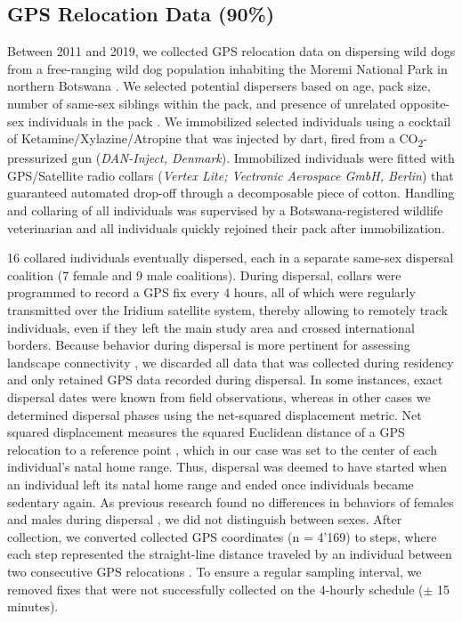 \documentclass[abstract=on,10pt,a4paper,bibliography=totocnumbered]{article}
\begin{document}
\subsection{GPS Relocation Data (90\%)}
Between 2011 and 2019, we collected GPS relocation data on dispersing wild dogs
from a free-ranging wild dog population inhabiting the Moremi National Park in
northern Botswana \citep{Cozzi.2020, Hofmann.2021}. We selected potential
dispersers based on age, pack size, number of same‐sex siblings within the pack,
and presence of unrelated opposite-sex individuals in the pack
\citep{McNutt.1996, Behr.2020}. We immobilized selected individuals using a
cocktail of Ketamine/Xylazine/Atropine \citep{Osofsky.1996, Cozzi.2020} that was
injected by dart, fired from a CO\textsubscript{2}-pressurized gun
(\textit{DAN-Inject, Denmark}). Immobilized individuals were fitted with
GPS/Satellite radio collars (\textit{Vertex Lite; Vectronic Aerospace GmbH,
Berlin}) that guaranteed automated drop-off through a decomposable piece of
cotton. Handling and collaring of all individuals was supervised by a
Botswana-registered wildlife veterinarian and all individuals quickly rejoined
their pack after immobilization.

16 collared individuals eventually dispersed, each in a separate same-sex
dispersal coalition (7 female and 9 male coalitions). During dispersal, collars
were programmed to record a GPS fix every 4 hours, all of which were regularly
transmitted over the Iridium satellite system, thereby allowing to remotely
track individuals, even if they left the main study area and crossed
international borders. Because behavior during dispersal is more pertinent for
assessing landscape connectivity \citep{Elliot.2014, Abrahms.2017}, we discarded
all data that was collected during residency and only retained GPS data recorded
during dispersal. In some instances, exact dispersal dates were known from field
observations, whereas in other cases we determined dispersal phases using the
net-squared displacement metric. Net squared displacement measures the squared
Euclidean distance of a GPS relocation to a reference point \citep{Borger.2012},
which in our case was set to the center of each individual's natal home range.
Thus, dispersal was deemed to have started when an individual left its natal
home range and ended once individuals became sedentary again. As previous
research found no differences in behaviors of females and males during dispersal
\citep{Woodroffe.2019, Cozzi.2020}, we did not distinguish between sexes. After
collection, we converted collected GPS coordinates (n = 4'169) to steps, where
each step represented the straight-line distance traveled by an individual
between two consecutive GPS relocations \citep{Turchin.1998}. To ensure a
regular sampling interval, we removed fixes that were not successfully collected
on the 4-hourly schedule (\( \pm \) 15 minutes).
\end{document}
